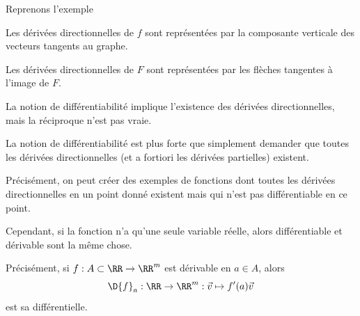 \begin{frame}{Reprenons l'exemple}
  \begin{center}
  \end{center}\pause{}
  Les dérivées directionnelles de \(f\) sont représentées par la composante verticale des vecteurs tangents au graphe.\pause{}

  Les dérivées directionnelles de \(F\) sont représentées par les flèches tangentes à l'image de \(F\).
\end{frame}

\begin{frame}
  \begin{remark*}
    La notion de différentiabilité implique l'existence des dérivées directionnelles, mais la réciproque n'est pas vraie.\pause{}

    La notion de différentiabilité est plus forte que simplement demander que toutes les dérivées directionnelles (et a fortiori les dérivées partielles) existent.\pause{}

    Précisément, on peut créer des exemples de fonctions dont toutes les dérivées directionnelles en un point donné existent\pause{} mais qui n'est pas différentiable en ce point.\pause{}
  \end{remark*}
  \begin{remark*}
    Cependant, si la fonction n'a qu'une seule variable réelle,\pause{} alors \og différentiable\fg{} et \og dérivable\fg{} sont la même chose.\pause{}

    Précisément,\pause{} si \(f : A \subset\RR \to\RR^m\) est dérivable en \(a \in A\), alors\pause{}
    \begin{equation*}
      \D{f}_{a} : \RR \to \RR^m : \vec{v} \mapsto f'(a) \vec{v}
    \end{equation*}
    est sa différentielle.
  \end{remark*}
\end{frame}

